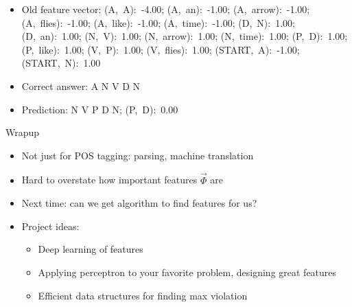 \documentclass[compress]{beamer}
\begin{document}
\begin{frame}
\begin{itemize}
\item Old feature vector: (A,~A):~-4.00; (A,~an):~-1.00; (A,~arrow):~-1.00; (A,~flies):~-1.00; (A,~like):~-1.00; (A,~time):~-1.00; (D,~N):~1.00; (D,~an):~1.00; (N,~V):~1.00; (N,~arrow):~1.00; (N,~time):~1.00; (P,~D):~1.00; (P,~like):~1.00; (V,~P):~1.00; (V,~flies):~1.00; (START,~A):~-1.00; (START,~N):~1.00
\item Correct answer: A N V D N
\item Prediction: \alert<2>{N} \alert<2>{V} \alert<2>{P} D N; \alert<5>{(P,~D):~0.00}
\end{itemize}
\end{frame}



\begin{frame}{Wrapup}

  \begin{itemize}
    \item Not just for POS tagging: parsing, machine translation
    \item Hard to overstate how important features $\vec \Phi$ are
    \item Next time: can we get algorithm to find features for us?
      \pause
    \item Project ideas:
      \begin{itemize}
        \item Deep learning of features
        \item Applying perceptron to your favorite problem, designing
          great features
        \item Efficient data structures for finding max violation
      \end{itemize}
  \end{itemize}

\end{frame}
\end{document}
